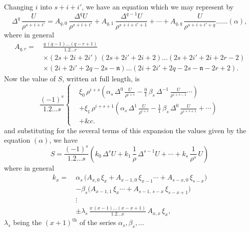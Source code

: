 \documentclass[11pt]{article}
\begin{document}
Changing $i$ into $s + i + i'$, we have an equation which we may represent by
\[
\Delta^{q}\,\frac{U}{\rho^{s+i+i'}} = A_{q,0}\,\frac{\Delta^{q}U}{\rho^{s+i+i'}} + A_{q,1}\,\frac{\Delta^{q-1}U}{\rho^{s+i+i'+1}} + \cdots + A_{q,q}\,\frac{U}{\rho^{s+i+i'+q}}\ldots\ldots(\alpha),
\]
where in general
\[
\begin{aligned}
A_{q,r} =\ & \frac{q\,(q-1)\ldots(q-r+1)}{1.2\ldots r}\\
& \times (2s + 2i + 2i')\,(2s + 2i' + 2i + 2)\ldots(2s + 2i' + 2i + 2r - 2) \\
& \times (2i + 2i' + 2q - 2s - \mathfrak{n})\ldots(2i + 2i' + 2q - 2s - \mathfrak{n} - 2r + 2).
\end{aligned}
\]
Now the value of $S$, written at full length, is
\[
\frac{(-1)^{s}}{1.2\ldots s}\left\{
\begin{aligned}
& \xi_{0}\,\rho^{i+s}\left(\alpha_{s}\,\Delta^{0}\,\frac{U}{\rho^{i+s}} - \frac{0}{1}\,\beta_{s}\,\Delta^{-1}\,\frac{U}{\rho^{i+s-1}}\cdots\right) \\
& + \xi_{1}\,\rho^{i+s+1}\left(\alpha_{s}\,\Delta^{1}\,\frac{U}{\rho^{i+s}} - \frac{1}{1}\,\beta_{s}\,\Delta^{0}\,\frac{U}{\rho^{i+s+1}} + \cdots\right) \\
& + \&c.
\end{aligned}\right.
\]
and substituting for the several terms of this expansion the values given by the equation $(\alpha)$, we have
\[
S = \frac{(-1)^{s}}{1.2\ldots s}\left(k_{0}\,\Delta^{s}U + k_{1}\,\frac{1}{\rho}\,\Delta^{s-1}U + \cdots + k_{s}\,\frac{1}{\rho^{s}}\,U\right)
\]
where in general
\[
\begin{aligned}
k_{x} =\ & \alpha_{s}\,\bigl(A_{x,0}\,\xi_{x} + A_{x-1,0}\,\xi_{x-1} \cdots + A_{s-x,0}\,\xi_{s-x}\bigr) \\
& - \beta_{s}\bigl(A_{x-1,1}\,\xi_{x}\cdots + A_{s-1,\,s-x}\,\xi_{s-x+1}\bigr) \\
& \vdots \\
& \pm \lambda_{s}\,\frac{x\,(x-1)\ldots(x - x + 1)}{1.2\ldots x}\,A_{x,x}\,\xi_{x},
\end{aligned}
\]
$\lambda_{s}$ being the $(x + 1)^{\text{th}}$ of the series $\alpha_{s}, \beta_{s}, \ldots$

\clearpage
\end{document}
